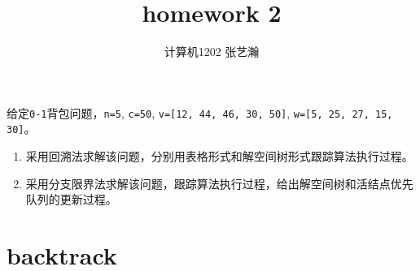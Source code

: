 \documentclass{article}
\begin{document}
\begin{CJK*}{UTF8}{gbsn}

\title{homework 2}
\author{计算机1202 张艺瀚}
\maketitle

给定\verb|0-1|背包问题，\verb|n=5|, \verb|c=50|, \verb|v=[12, 44, 46, 30, 50]|, \verb|w=[5, 25, 27, 15, 30]|。 \\
\begin{enumerate}
\item 采用回溯法求解该问题，分别用表格形式和解空间树形式跟踪算法执行过程。
\item 采用分支限界法求解该问题，跟踪算法执行过程，给出解空间树和活结点优先队列的更新过程。
\end{enumerate}

\section{backtrack}


\end{CJK*}
\end{document}
